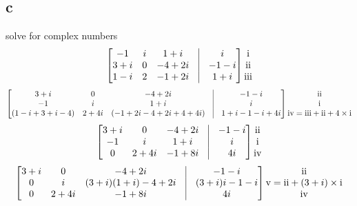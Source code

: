 \documentclass[a4paper,10pt]{article}
\newcommand{\RN}[1]{%
  \textup{\uppercase\expandafter{\romannumeral#1}}%
}
\begin{document}
\subsection*{c}
solve for complex numbers
\[
\begin{bmatrix}
 -1  & i & 1+i & \vline & i\\
 3+i & 0 & -4+2i& \vline & -1-i\\
 1-i & 2 & -1+2i & \vline & 1+i\\
\end{bmatrix}
\begin{matrix}
 \RN{1}\\ \RN{2}\\ \RN{3}\\
\end{matrix}
\]
\[
\begin{bmatrix}
 3+i & 0 & -4+2i& \vline & -1-i\\
 -1  & i & 1+i & \vline & i\\
 (1-i+3+i -4)& 2+4i &( -1+2i-4+2i +4+4i) & \vline & 1+i-1-i+4i\\
\end{bmatrix}
\begin{matrix}
 \RN{2}\\ \RN{1}\\ \RN{4}=\RN{3}+\RN{2}+4\times \RN{1}\\
\end{matrix}
\]
\[
 \begin{bmatrix}
 3+i & 0 & -4+2i& \vline & -1-i\\
 -1  & i & 1+i & \vline & i\\
 0 & 2+4i & -1+8i   & \vline & 4i\\
\end{bmatrix}
\begin{matrix}

\RN{2}\\ \RN{1}\\ \RN{4}\\
\end{matrix}
\]
\[
 \begin{bmatrix}
 3+i & 0     & -4+2i & \vline & -1-i\\
 0   & i     & (3+i)(1+i) -4+2i  & \vline & ( 3+i )i -1-i\\
 0   & 2+4i  & -1+8i & \vline & 4i\\
\end{bmatrix}
\begin{matrix}
\RN{2}\\ \RN{5}= \RN{2}+(3+i)\times \RN{1} \\ \RN{4}\\
\end{matrix}
\]
\end{document}
